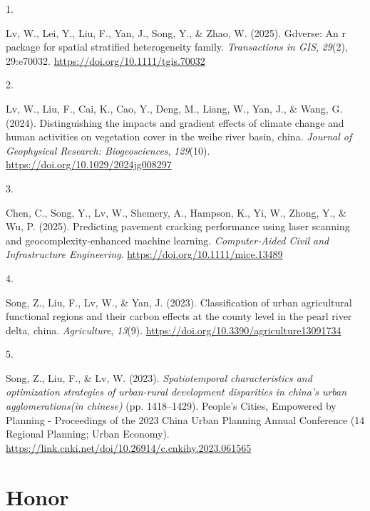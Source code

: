 \documentclass[11pt,a4paper,]{moderncv}
\newlength{\cslhangindent}
\newlength{\csllabelwidth}
\newenvironment{CSLReferences}[2] %
 {\begin{list}{}{%
  \setlength{\itemindent}{0pt}
  \setlength{\leftmargin}{0pt}
  \setlength{\parsep}{0pt}
  \ifodd #1
   \setlength{\leftmargin}{\cslhangindent}
   \setlength{\itemindent}{-1\cslhangindent}
  \fi
  \setlength{\itemsep}{#2\baselineskip}}}
 {\end{list}}
\newcommand{\CSLLeftMargin}[1]{\parbox[t]{\csllabelwidth}{\strut#1\strut}}
\newcommand{\CSLRightInline}[1]{\parbox[t]{\linewidth - \csllabelwidth}{\strut#1\strut}}
\begin{document}
\label{refs-0ec9cd99dd6c888b81e78fc0c10b8c98}
\begin{CSLReferences}{0}{0}
\CSLLeftMargin{1. }%
\CSLRightInline{Lv, W., Lei, Y., Liu, F., Yan, J., Song, Y., \& Zhao, W.
(2025). Gdverse: An r package for spatial stratified heterogeneity
family. \emph{Transactions in GIS}, \emph{29}(2), 29:e70032.
\url{https://doi.org/10.1111/tgis.70032}}

\CSLLeftMargin{2. }%
\CSLRightInline{Lv, W., Liu, F., Cai, K., Cao, Y., Deng, M., Liang, W.,
Yan, J., \& Wang, G. (2024). Distinguishing the impacts and gradient
effects of climate change and human activities on vegetation cover in
the weihe river basin, china. \emph{Journal of Geophysical Research:
Biogeosciences}, \emph{129}(10).
\url{https://doi.org/10.1029/2024jg008297}}

\CSLLeftMargin{3. }%
\CSLRightInline{Chen, C., Song, Y., Lv, W., Shemery, A., Hampson, K.,
Yi, W., Zhong, Y., \& Wu, P. (2025). Predicting pavement cracking
performance using laser scanning and geocomplexity‐enhanced machine
learning. \emph{Computer-Aided Civil and Infrastructure Engineering}.
\url{https://doi.org/10.1111/mice.13489}}

\CSLLeftMargin{4. }%
\CSLRightInline{Song, Z., Liu, F., Lv, W., \& Yan, J. (2023).
Classification of urban agricultural functional regions and their carbon
effects at the county level in the pearl river delta, china.
\emph{Agriculture}, \emph{13}(9).
\url{https://doi.org/10.3390/agriculture13091734}}

\CSLLeftMargin{5. }%
\CSLRightInline{Song, Z., Liu, F., \& Lv, W. (2023).
\emph{Spatiotemporal characteristics and optimization strategies of
urban-rural development disparities in china's urban agglomerations(in
chinese)} (pp. 1418--1429). People's Cities, Empowered by Planning -
Proceedings of the 2023 China Urban Planning Annual Conference (14
Regional Planning; Urban Economy).
\url{https://link.cnki.net/doi/10.26914/c.cnkihy.2023.061565}}

\end{CSLReferences}

\section{Honor}\label{honor}
\end{document}
